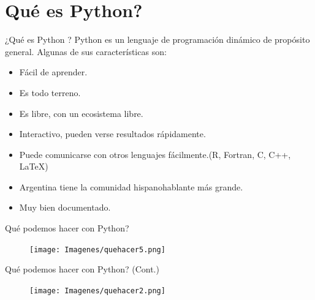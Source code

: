 \documentclass[bigger]{beamer}
\begin{document}
\section{Qu\'e es Python?}

\begin{frame}{¿Qu\'e es Python ?}
    Python es un lenguaje de programación dinámico de propósito general. Algunas de sus características son:
    \begin{itemize}
        \item Fácil de aprender.
        \item Es todo terreno. 
        \item Es libre, con un ecosistema libre.
        \item Interactivo, pueden verse resultados rápidamente.
        \item Puede comunicarse con otros lenguajes fácilmente.(R, Fortran, C, C++, LaTeX)
        \item Argentina tiene la comunidad hispanohablante más grande.
        \item Muy bien documentado.
    \end{itemize}
\end{frame}

\begin{frame}{Qu\'e podemos hacer con Python?}
 \begin{figure}[h]
        \texttt{[image: Imagenes/quehacer5.png]}
\end{figure}
\end{frame}

\begin{frame}{Qu\'e podemos hacer con Python? (Cont.)}

 \begin{figure}[h]
        \texttt{[image: Imagenes/quehacer2.png]}
\end{figure}
\end{frame}
\end{document}
